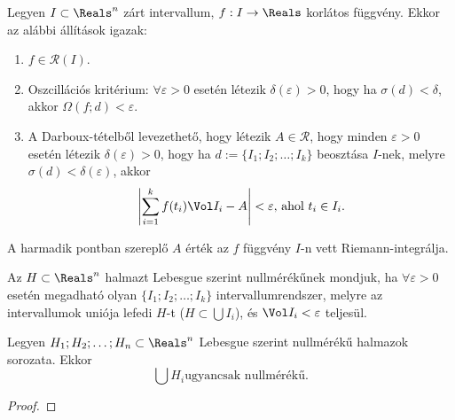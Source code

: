 
\begin{theorem}
  Legyen $I \subset \Reals^n$ zárt intervallum, $f: I \to \Reals$ korlátos
  függvény. Ekkor az alábbi állítások igazak:
  \begin{enumerate}
    \item $f \in \mathcal R(I)$.
    \item Oszcillációs kritérium: $\forall \varepsilon > 0$ esetén létezik
          $\delta(\varepsilon) > 0$, hogy ha $\sigma(d) < \delta$, akkor
          $\Omega(f; d) < \varepsilon$.
    \item A Darboux-tételből levezethető, hogy létezik $A \in \mathcal R$, hogy
          minden $\varepsilon > 0$ esetén létezik $\delta(\varepsilon) > 0$,
          hogy ha $d := \{ I_1; I_2; \ldots; I_k \}$ beosztása $I$-nek, melyre
          $\sigma(d) < \delta(\varepsilon)$, akkor
          $$
            \left|\sum_{i = 1}^k f(t_i) \Vol I_i - A\right| < \varepsilon
            \text{, ahol } t_i \in I_i
            \text.
          $$
  \end{enumerate}
\end{theorem}

\begin{note}
  A harmadik pontban szereplő $A$ érték az $f$ függvény $I$-n vett
  Riemann-integrálja.
\end{note}

\begin{definition}
  Az $H \subset \Reals^n$ halmazt Lebesgue szerint nullmérékűnek mondjuk, ha
  $\forall \varepsilon > 0$ esetén megadható olyan $\{ I_1; I_2; \ldots; I_k \}$
  intervallumrendszer, melyre az intervallumok uniója lefedi $H$-t
  ($H \subset \bigcup I_i$), és $\Vol I_i < \varepsilon$ teljesül.
\end{definition}

\begin{statement}
  Legyen $H_1; H_2; \ldots; H_n \subset \Reals^n$ Lebesgue szerint nullmérékű
  halmazok sorozata. Ekkor $$\bigcup H_i \text{ugyancsak nullmérékű.}$$

  \begin{proof}
    \vspace{8em}
  \end{proof}
\end{statement}

